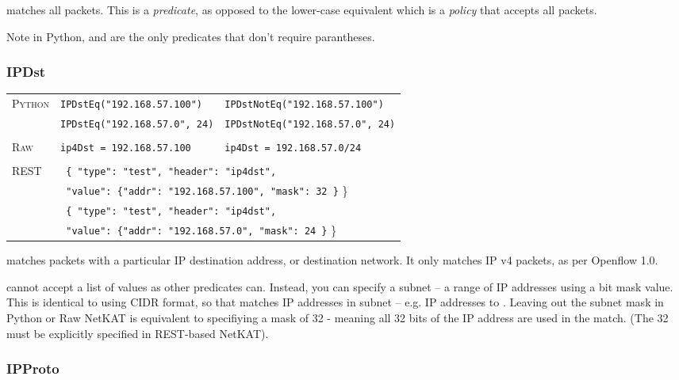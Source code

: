  matches all packets.  This is a \emph{predicate}, as opposed to the lower-case 
equivalent  
which is a \emph{policy} that accepts all packets. 

Note in Python,  and  are the only predicates that don't require parantheses.

\subsubsection{IPDst}

\bigskip
\begin{tabularx}{\linewidth}{lXX}
\textsc{Python}   & \texttt{IPDstEq("192.168.57.100")}    & \texttt{IPDstNotEq("192.168.57.100")} \\
    & \texttt{IPDstEq("192.168.57.0", 24)}  & \texttt{IPDstNotEq("192.168.57.0", 24)} \\ \\
\textsc{Raw}    & \texttt{ip4Dst = 192.168.57.100}     & \texttt{ip4Dst = 192.168.57.0/24} \\ \\
\textsc{REST} & \multicolumn{2}{l}{\texttt{ \{ "type": "test", "header": "ip4dst",}} \\
   & \multicolumn{2}{l}{\texttt{  "value": \{"addr": "192.168.57.100", "mask": 32 \}} \}} \\
   & \multicolumn{2}{l}{\texttt{ \{ "type": "test", "header": "ip4dst",}} \\
   & \multicolumn{2}{l}{\texttt{  "value": \{"addr": "192.168.57.0", "mask": 24 \}} \}} \\
\end{tabularx}

 matches packets with a particular IP destination address, or destination network.  It only matches
IP v4 packets, as per Openflow 1.0.  

 cannot accept a list of values as other predicates can.  
Instead, you can specify a subnet -- a range
of IP addresses using a bit mask value.  This is identical to using CIDR format, so that 
 matches IP addresses in subnet  -- e.g. 
IP addresses  to .  Leaving out the subnet mask in Python 
or Raw NetKAT is equivalent to specifiying a mask of 32 - meaning all 32 bits of the IP address are used
in the match.  (The 32 must be explicitly specified in REST-based NetKAT).

\subsubsection{IPProto}

